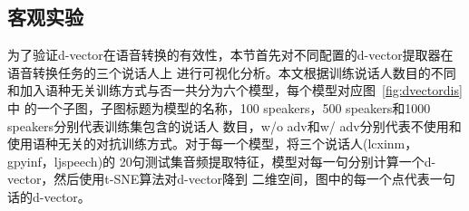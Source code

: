 \subsection{客观实验}

为了验证d-vector在语音转换的有效性，本节首先对不同配置的d-vector提取器在语音转换任务的三个说话人上
进行可视化分析。本文根据训练说话人数目的不同和加入语种无关训练方式与否一共分为六个模型，每个模型对应图~\ref{fig:dvectordis}中
的一个子图，子图标题为模型的名称，100 speakers，500 speakers和1000 speakers分别代表训练集包含的说话人
数目，w/o adv和w/ adv分别代表不使用和使用语种无关的对抗训练方式。对于每一个模型，将三个说话人(lcxinm，gpyinf，ljspeech)的
20句测试集音频提取特征，模型对每一句分别计算一个d-vector，然后使用t-SNE算法\cite{maaten2008visualizing}对d-vector降到
二维空间，图中的每一个点代表一句话的d-vector。


